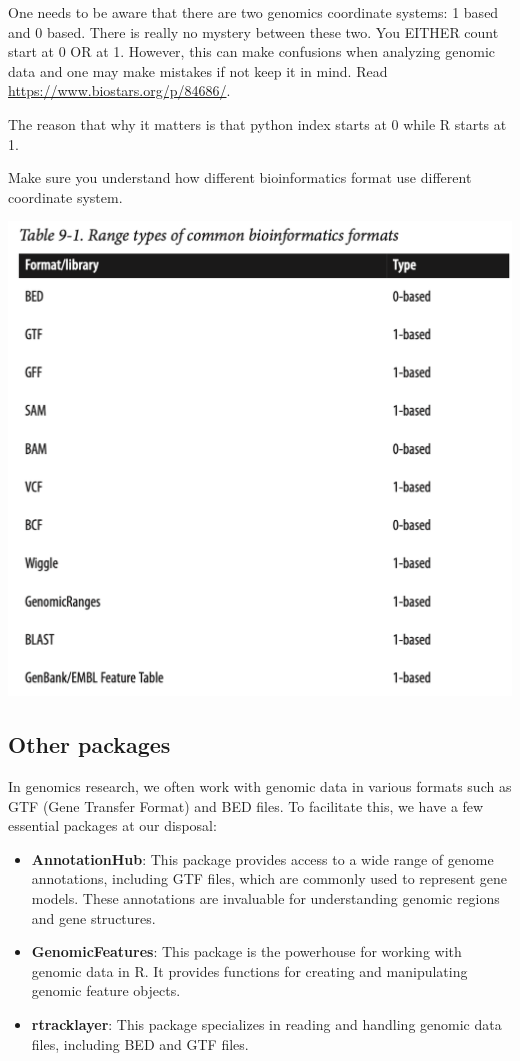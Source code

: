 \documentclass[
]{book}
\begin{document}
One needs to be aware that there are two genomics coordinate systems: 1 based and 0 based. There is really no mystery between these two. You EITHER count start at 0 OR at 1. However, this can make confusions when analyzing genomic data and one may make mistakes if not keep it in mind. Read \url{https://www.biostars.org/p/84686/}.

The reason that why it matters is that python index starts at 0 while R starts at 1.

Make sure you understand how different bioinformatics format use different coordinate
system.

\includegraphics{images/coordinate.png}

\hypertarget{other-packages}{%
\subsection{Other packages}\label{other-packages}}

In genomics research, we often work with genomic data in various formats such as GTF (Gene Transfer Format) and BED files. To facilitate this, we have a few essential packages at our disposal:

\begin{itemize}
\item
  \textbf{AnnotationHub}: This package provides access to a wide range of genome annotations, including GTF files, which are commonly used to represent gene models. These annotations are invaluable for understanding genomic regions and gene structures.
\item
  \textbf{GenomicFeatures}: This package is the powerhouse for working with genomic data in R. It provides functions for creating and manipulating genomic feature objects.
\item
  \textbf{rtracklayer}: This package specializes in reading and handling genomic data files, including BED and GTF files.
\end{itemize}
\end{document}
